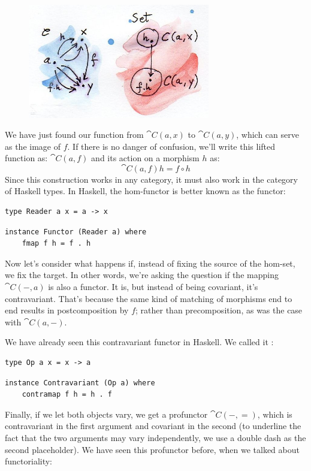 \begin{figure}[H]
\centering
\includegraphics[width=3.12500in]{images/hom-functor.jpg}
\end{figure}

\noindent
We have just found our function from $\cat{C}(a, x)$ to
$\cat{C}(a, y)$, which can serve as the image of $f$. If there
is no danger of confusion, we'll write this lifted function as: $\cat{C}(a, f)$
and its action on a morphism $h$ as:
\[\cat{C}(a, f) h = f \circ h\]
Since this construction works in any category, it must also work in the
category of Haskell types. In Haskell, the hom-functor is better known
as the  functor:

\begin{Verbatim}
type Reader a x = a -> x
\end{Verbatim}
\begin{Verbatim}
instance Functor (Reader a) where
    fmap f h = f . h
\end{Verbatim}
Now let's consider what happens if, instead of fixing the source of the
hom-set, we fix the target. In other words, we're asking the question if
the mapping $\cat{C}(-, a)$ is also a functor. It is, but instead of being covariant, it's
contravariant. That's because the same kind of matching of morphisms end
to end results in postcomposition by $f$; rather than
precomposition, as was the case with $\cat{C}(a, -)$.

We have already seen this contravariant functor in Haskell. We called it
:

\begin{Verbatim}
type Op a x = x -> a
\end{Verbatim}
\begin{Verbatim}
instance Contravariant (Op a) where
    contramap f h = h . f
\end{Verbatim}
Finally, if we let both objects vary, we get a profunctor
$\cat{C}(-, =)$, which is contravariant in the first argument and
covariant in the second (to underline the fact that the two arguments
may vary independently, we use a double dash as the second placeholder).
We have seen this profunctor before, when we talked about functoriality:

